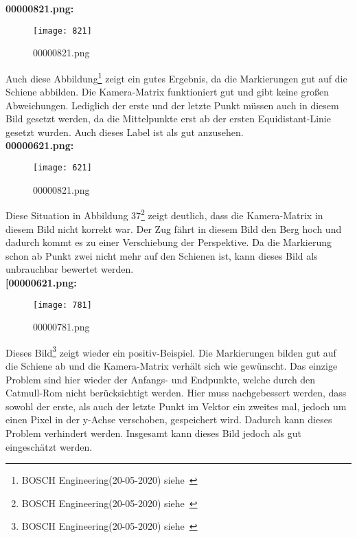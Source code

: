 \noindent
\newpage
\textbf {00000821.png:}
\\

\noindent
\begin{figure}[H]
  \texttt{[image: 821]}
  \caption{00000821.png}
\end{figure}

\noindent
Auch diese Abbildung\footnote{BOSCH Engineering(20-05-2020) siehe~\cite{0520}} zeigt ein gutes Ergebnis, da die Markierungen gut auf die Schiene abbilden. Die Kamera-Matrix funktioniert gut und gibt keine großen Abweichungen. Lediglich der erste und der letzte Punkt müssen auch in diesem Bild gesetzt werden, da die Mittelpunkte erst ab der ersten Equidistant-Linie gesetzt wurden. Auch dieses Label ist als gut anzusehen.
\\

\noindent
\newpage
\textbf {00000621.png:}
\\

\noindent
\begin{figure}[H]
  \texttt{[image: 621]}
  \caption{00000821.png}
\end{figure}

\noindent
Diese Situation in Abbildung 37\footnote{BOSCH Engineering(20-05-2020) siehe~\cite{0520}} zeigt deutlich, dass die Kamera-Matrix in diesem Bild nicht korrekt war. Der Zug fährt in diesem Bild den Berg hoch und dadurch kommt es zu einer Verschiebung der Perspektive. Da die Markierung schon ab Punkt zwei nicht mehr auf den Schienen ist, kann dieses Bild als unbrauchbar bewertet werden.
\\

\noindent
\newpage
\textbf {[00000621.png:}
\\

\noindent
\begin{figure}[H]
  \texttt{[image: 781]}
  \caption{00000781.png}
\end{figure}

\noindent
Dieses Bild\footnote{BOSCH Engineering(20-05-2020) siehe~\cite{0520}} zeigt wieder ein positiv-Beispiel. Die Markierungen bilden gut auf die Schiene ab und die Kamera-Matrix verhält sich wie gewünscht. Das einzige Problem sind hier wieder der Anfangs- und Endpunkte, welche durch den Catmull-Rom nicht berücksichtigt werden. Hier muss nachgebessert werden, dass sowohl der erste, als auch der letzte Punkt im Vektor ein zweites mal, jedoch um einen Pixel in der y-Achse verschoben, gespeichert wird. Dadurch kann dieses Problem verhindert werden. Insgesamt kann dieses Bild jedoch als gut eingeschätzt werden.
\\

